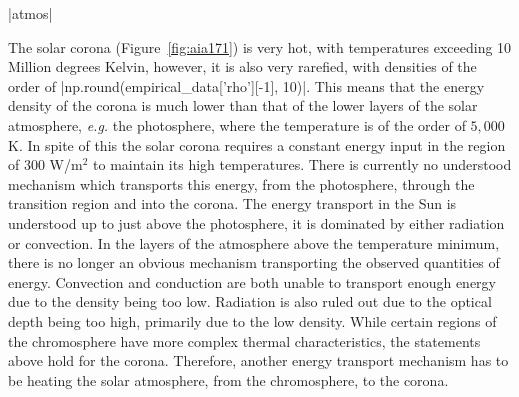 \py[chapter1]|atmos|

The solar corona (Figure~\ref{fig:aia171}) is very hot, with temperatures exceeding 10 Million degrees Kelvin, however, it is also very rarefied, with densities of the order of \py[chapter1]|np.round(empirical_data['rho'][-1], 10)|.
This means that the energy density of the corona is much lower than that of the lower layers of the solar atmosphere, \textit{e.g.} the photosphere, where the temperature is of the order of $5,000$ K.
In spite of this the solar corona requires a constant energy input in the region of $300$ W/m$^2$ \citep{priest2014} to maintain its high temperatures.
There is currently no understood mechanism which transports this energy, from the photosphere, through the transition region and into the corona.
The energy transport in the Sun is understood up to just above the photosphere, it is dominated by either radiation or convection.
In the layers of the atmosphere above the temperature minimum, there is no longer an obvious mechanism transporting the observed quantities of energy.
Convection and conduction are both unable to transport enough energy due to the density being too low.
Radiation is also ruled out due to the optical depth being too high, primarily due to the low density.
While certain regions of the chromosphere have more complex thermal characteristics, the statements above hold for the corona.
Therefore, another energy transport mechanism has to be heating the solar atmosphere, from the chromosphere, to the corona.



